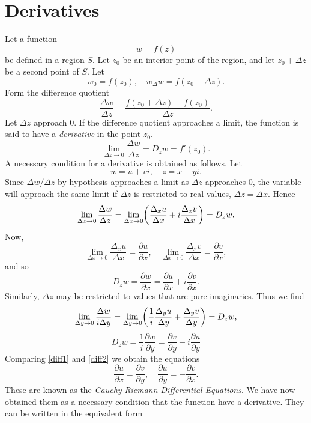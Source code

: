\documentclass[twosided]{memoir}
\begin{document}
\section{Derivatives}
Let a function
\[
	w=f(z)
\] be defined in a region $S$. Let $z_0$ be an interior point of the region, and let $z_0+\Delta z$ be a second point of $S$. Let
\[
	w_0=f(z_0), \quad w_\Delta w=f(z_0+\Delta z)
.\] Form the difference quotient
\[
	\frac{\Delta w}{\Delta z} =\frac{f(z_0+\Delta z)-f(z_0)}{\Delta z} 
.\] Let $\Delta z$ approach $0$. If the difference quotient approaches a limit, the function is said to have a \emph{derivative} in the point $z_0$. 
\[
	\lim\limits_{\Delta z \to 0} \frac{\Delta w}{\Delta z} =D_zw=f'(z_0)
.\] A necessary condition for a derivative is obtained as follows. Let
\[
w=u+vi, \quad z=x+yi
.\] Since $\Delta w / \Delta z$ by hypothesis approaches a limit as $\Delta z$ approaches $0$, the variable will approach the same limit if $\Delta z$ is restricted to real values, $\Delta z=\Delta x$. Hence
\[
	\lim\limits_{\Delta z \to 0} \frac{\Delta w}{\Delta z} =\lim\limits_{\Delta x \to 0} \pbr*{\frac{\Delta_x u}{\Delta x} +i \frac{\Delta_x v}{\Delta x} } =D_zw
.\] Now,
\[
\lim\limits_{\Delta x \to 0} \frac{\Delta _x u}{\Delta x} = \frac{\partial u}{\partial x} ,\quad \lim\limits_{\Delta x \to 0} \frac{\Delta _xv}{\Delta x} =\frac{\partial v}{\partial x}  
,\] and so
\begin{equation}\label{diff1}
D_zw= \frac{\partial w}{\partial x} =\frac{\partial u}{\partial x} +i \frac{\partial v}{\partial x}.
\end{equation} Similarly, $\Delta z$ may be restricted to values that are pure imaginaries. Thus we find
\[
	\lim\limits_{\Delta y \to 0} \frac{\Delta w}{i\Delta y} =\lim\limits_{\Delta y \to 0} \pbr*{\frac{1}{i}\frac{\Delta _yu}{\Delta y} +\frac{\Delta _yv}{\Delta y} } =D_zw
,\] 
\begin{equation}\label{diff2}
D_zw=\frac{1}{i} \frac{\partial w}{\partial y} = \frac{\partial v}{\partial y} -i \frac{\partial u}{\partial y} 
\end{equation}
Comparing \ref{diff1} and \ref{diff2} we obtain the equations
\begin{equation}\label{creq}
\frac{\partial u}{\partial x} =\frac{\partial v}{\partial y} , \quad \frac{\partial u}{\partial y} =-\frac{\partial v}{\partial x}.
\end{equation}
These are known as the \emph{Cauchy-Riemann Differential Equations}. We have now obtained them as a necessary condition that the function have a derivative. They can be written in the equivalent form
\end{document}

